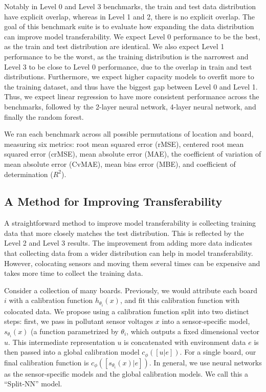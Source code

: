 \documentclass[journal abbreviation, manuscript]{copernicus}
\begin{document}
Notably in Level 0 and Level 3 benchmarks, the train and test data distribution have explicit overlap, whereas in Level 1 and 2, there is no explicit overlap. 
The goal of this benchmark suite is to evaluate how expanding the data distribution can improve model transferability. We expect Level 0 performance to be the best, as the train and test distribution are identical. We also expect Level 1 performance to be the worst, as the training distribution is the narrowest and Level 3 to be close to Level 0 performance, due to the overlap in train and test distributions. 
Furthermore, we expect higher capacity models to overfit more to the training dataset, and thus have the biggest gap between Level 0 and Level 1. Thus, we expect linear regression to have more consistent performance across the benchmarks, followed by the 2-layer neural network, 4-layer neural network, and finally the random forest.

We ran each benchmark across all possible permutations of location and board,
measuring six metrics: root mean squared error (rMSE), centered root mean squared error (crMSE), mean absolute error (MAE), the coefficient of variation of mean absolute error (CvMAE), mean bias error (MBE), and coefficient of determination ($R^2$).

\subsection{A Method for Improving Transferability}

A straightforward method to improve model transferability is collecting training data that more closely matches the test distribution.
This is reflected by the Level 2 and Level 3 results. The improvement from adding more data indicates that collecting data from a wider distribution can help in model transferability.
However, colocating sensors and moving them
several times can be expensive and takes more time to collect the training data.

Consider a collection of many boards. Previously, we would attribute each board $i$ with a calibration function $h_{\theta_i}(x)$, and fit this calibration function with colocated data.
We propose using a calibration function split into two distinct steps: first, we pass in pollutant sensor voltages $x$ into a sensor-specific model, $s_{\theta_i}(x)$ (a function parametrized by $\theta_i$, which outputs a fixed dimensional vector $u$. This intermediate representation $u$ is concatenated with environment data $e$ is then passed into a global calibration model $c_\phi([u | e])$. For a single board, our final calibration function is $c_\phi([s_{\theta_i}(x) | e])$.
In general, we use neural networks as the sensor-specific models and the global calibration models. We call this a ``Split-NN'' model. 
\end{document}
